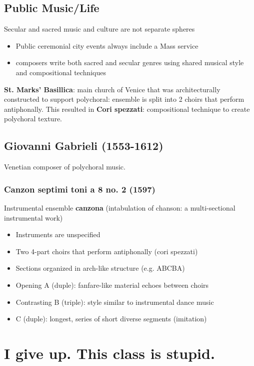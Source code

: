\documentclass{article}
\begin{document}
  \subsection{Public Music/Life}
  Secular and sacred music and culture are not separate spheres
  \begin{itemize}
    \item Public ceremonial city events always include a Mass service
    \item composers write both sacred and secular genres using shared musical style and compositional techniques
  \end{itemize}
  \textbf{St. Marks' Basillica}: main church of Venice that was architecturally constructed to support polychoral: ensemble is split into 2 choirs that perform antiphonally. This resulted in \textbf{Cori spezzati}: compositional technique to create polychoral texture.
  \subsection{Giovanni Gabrieli (1553-1612)}
  Venetian composer of polychoral music.
  \subsubsection{Canzon septimi toni a 8 no. 2 (1597)}
  Instrumental ensemble \textbf{canzona} (intabulation of chanson: a multi-sectional instrumental work)
  \begin{itemize}
    \item Instruments are unspecified
    \item Two 4-part choirs that perform antiphonally (cori spezzati)
    \item Sections organized in arch-like structure (e.g. ABCBA)
    \item Opening A (duple): fanfare-like material echoes between choirs
    \item Contrasting B (triple): style similar to instrumental dance music
    \item C (duple): longest, series of short diverse segments (imitation)
  \end{itemize}

\section{I give up. This class is stupid.}
\end{document}
